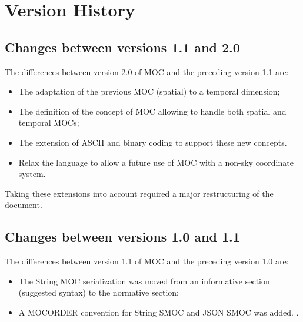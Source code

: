 \documentclass[11pt,a4paper]{ivoa}
\begin{document}



\appendix
\section{Version History}

\subsection{Changes between versions 1.1 and 2.0}

The differences between version 2.0 of MOC and the preceding version 1.1 are:
\begin{itemize}
   \item The adaptation of the previous MOC (spatial) to a temporal
     dimension;
   \item The definition of the concept of MOC allowing to handle both
     spatial and temporal MOCs;
   \item The extension of ASCII and binary coding to support these new
     concepts.
    \item Relax the language to allow a future use of MOC with a non-sky coordinate system. 
\end{itemize}
Taking these extensions into account required a major restructuring of
the document.

\subsection{Changes between versions 1.0 and 1.1}
The differences between version 1.1 of MOC and the preceding version
1.0 are:
\begin{itemize}
   \item The String MOC serialization was moved from an informative
     section (suggested syntax) to the normative section;
   \item A MOCORDER convention for String SMOC and JSON SMOC was added.
     \citep{2020arXiv200707519D}.
\end{itemize}



\newpage

\end{document}
